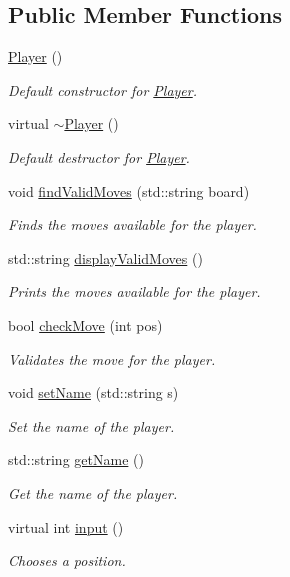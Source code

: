 \subsection*{Public Member Functions}
\begin{DoxyCompactItemize}
\item 
\mbox{\hyperlink{classPlayer_affe0cc3cb714f6deb4e62f0c0d3f1fd8}{Player}} ()
\begin{DoxyCompactList}\small\item\em Default constructor for \mbox{\hyperlink{classPlayer}{Player}}. \end{DoxyCompactList}\item 
virtual \mbox{\hyperlink{classPlayer_a749d2c00e1fe0f5c2746f7505a58c062}{$\sim$\+Player}} ()
\begin{DoxyCompactList}\small\item\em Default destructor for \mbox{\hyperlink{classPlayer}{Player}}. \end{DoxyCompactList}\item 
void \mbox{\hyperlink{classPlayer_affad011a9ad4f41e3ee316bb0be47d10}{find\+Valid\+Moves}} (std\+::string board)
\begin{DoxyCompactList}\small\item\em Finds the moves available for the player. \end{DoxyCompactList}\item 
std\+::string \mbox{\hyperlink{classPlayer_a00b37112d7ee56c91a0219dcacaece68}{display\+Valid\+Moves}} ()
\begin{DoxyCompactList}\small\item\em Prints the moves available for the player. \end{DoxyCompactList}\item 
bool \mbox{\hyperlink{classPlayer_a304c0a31df5ccf7acbdb2a2381facbb5}{check\+Move}} (int pos)
\begin{DoxyCompactList}\small\item\em Validates the move for the player. \end{DoxyCompactList}\item 
void \mbox{\hyperlink{classPlayer_af832a5f872ae4975563c3c5519320361}{set\+Name}} (std\+::string s)
\begin{DoxyCompactList}\small\item\em Set the name of the player. \end{DoxyCompactList}\item 
std\+::string \mbox{\hyperlink{classPlayer_af9a6045fa96f736664c4eab4caa5e8e5}{get\+Name}} ()
\begin{DoxyCompactList}\small\item\em Get the name of the player. \end{DoxyCompactList}\item 
virtual int \mbox{\hyperlink{classPlayer_a3e7c5ce7c59c8b5cc9d0b985a1baae91}{input}} ()
\begin{DoxyCompactList}\small\item\em Chooses a position. \end{DoxyCompactList}\end{DoxyCompactItemize}
